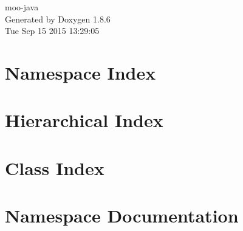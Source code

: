 \documentclass[twoside]{book}
\newcommand{\clearemptydoublepage}{%
  \newpage{\pagestyle{empty}\cleardoublepage}%
}
\begin{document}
\hypersetup{pageanchor=false}
\begin{titlepage}
\vspace*{7cm}
\begin{center}%
{\Large moo-\/java }\\
\vspace*{1cm}
{\large Generated by Doxygen 1.8.6}\\
\vspace*{0.5cm}
{\small Tue Sep 15 2015 13:29:05}\\
\end{center}
\end{titlepage}
\clearemptydoublepage
\tableofcontents
\clearemptydoublepage
{}
\hypersetup{pageanchor=true}

\chapter{Namespace Index}

\chapter{Hierarchical Index}

\chapter{Class Index}

\chapter{Namespace Documentation}

\end{document}
